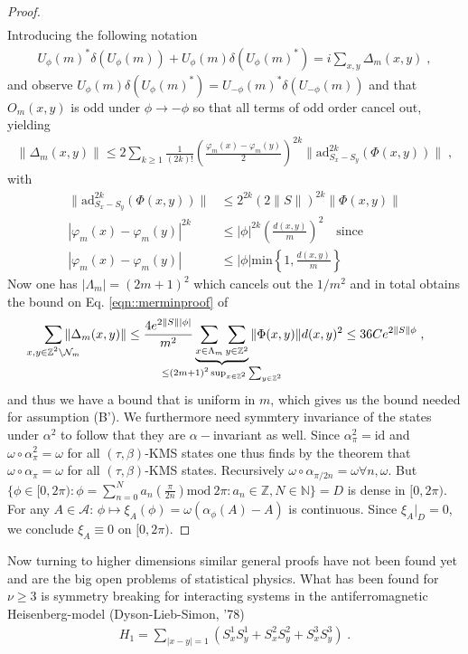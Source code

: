 \documentclass[
a4paper, %
11pt, %
onecolumn, %
openany, %
]{memoir}
\theoremstyle{definition}
\theoremstyle{remark}
\theoremstyle{plain}
\begin{document}
\begin{proof}
\begin{align}
\end{align}
Introducing the following notation \begin{align}
U_{\phi}(m)^*\delta(U_{\phi}(m))+U_{\phi}(m)\delta(U_{\phi}(m)^*)=i\sum_{x,y}\Delta_m(x,y)\; ,
\end{align}
and observe $U_{\phi}(m)\delta(U_{\phi}(m)^*)=U_{-\phi}(m)^*\delta(U_{-\phi}(m))$ and  that $O_m(x,y)$ is odd under $\phi\rightarrow -\phi$ so that all terms of odd order cancel out, yielding \begin{align}
\| \Delta_m(x,y)\| \leq 2 \sum_{k\geq 1} \frac{1}{(2k)!}\left(\frac{\varphi_m(x)-\varphi_m(y)}{2}\right)^{2k} \| \mathrm{ad}_{S_x-S_y}^{2k}(\Phi(x,y))\|\; ,
\end{align}
with \begin{align}
\| \mathrm{ad}_{S_x-S_y}^{2k}(\Phi(x,y))\| &\leq 2^{2k}(2\| S\| )^{2k}\|\Phi(x,y)\|\\
|\varphi_m(x)-\varphi_m(y)|^{2k}&\leq |\phi|^{2k}\left(\frac{d(x,y)}{m}\right)^2 \quad \text{since} \\|\varphi_m(x)-\varphi_m(y)|&\leq |\phi| \text{min}\left\{1,\frac{d(x,y)}{m}\right\}
\end{align}
Now one has $|\Lambda_m|=(2m+1)^2$ which cancels out the $1/m^2$ and in total obtains the bound on Eq. \eqref{eqn::merminproof} of \begin{align}
\sum_{\mathclap{x,y\in\mathbb{Z}^2\setminus\mathcal{N}_m}}\|\Delta_m(x,y)\| \leq \frac{4 e^{2\|S\||\phi|}}{m^2}\underbrace{\sum_{x\in\Lambda_m}\sum_{y\in\mathbb{Z}^2}}_{\mathclap{\leq (2m+1)^2\sup_{x\in\mathbb{Z}^2}\sum_{y\in\mathbb{Z}^2}}}\|\Phi(x,y)\| d(x,y)^2 \leq 36 C e^{2\|S\|\phi}\; ,
\end{align}
and thus we have a bound that is uniform in $m$, which gives us the bound needed for assumption (B'). We furthermore need symmtery invariance of the states under $\alpha^2$ to follow that they are $\alpha-$invariant as well. Since $\alpha_{\pi}^2=\mathrm{id}$ and $\omega\circ \alpha_{\pi}^2=\omega$ for all $(\tau,\beta)$-KMS states one thus finds by the theorem that $\omega\circ\alpha_{\pi}=\omega$ for all $(\tau,\beta)$-KMS states. Recursively $\omega\circ\alpha_{\pi/2n}=\omega \forall n,\omega$. But $\{\phi\in[0,2\pi):\phi=\sum_{n=0}^N a_n\left(\frac{\pi}{2n}\right)\mathrm{mod}~2\pi:a_n\in\mathbb{Z}, N\in\mathbb{N}\}=D$ is dense in $[0,2\pi)$. For any $A\in\mathcal{A}$: $\phi\mapsto\xi_A(\phi)=\omega(\alpha_{\phi}(A)-A)$ is continuous. Since $\xi_A|_D=0$, we conclude $\xi_A\equiv 0$ on $[0,2\pi)$.
\end{proof}
Now turning to higher dimensions similar general proofs have not been found yet and are the big open problems of statistical physics. What has been found for $\nu\geq 3$ is symmetry breaking for interacting systems in the antiferromagnetic Heisenberg-model (Dyson-Lieb-Simon, '78) \begin{align}
H_1 = \sum_{|x-y|=1}(S_x^1S_y^1+S_x^2S_y^2+S_x^3S_y^3)\; .
\end{align}
\end{document}
